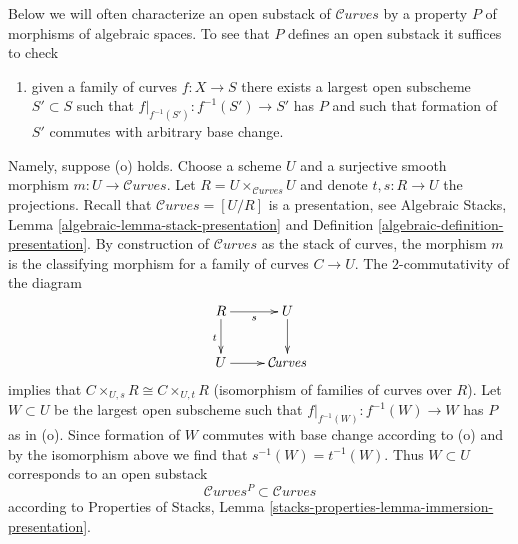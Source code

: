 \documentclass{stacks-project}
\theoremstyle{plain}
\theoremstyle{definition}
\theoremstyle{remark}
\numberwithin{equation}{subsection}
\def\Curvesstack{\mathcal{C}\!\mathit{urves}}
\begin{document}
\noindent
Below we will often characterize an open substack of $\Curvesstack$
by a property $P$ of morphisms of algebraic spaces. To see that $P$
defines an open substack it suffices to check
\begin{enumerate}
\item[(o)] given a family of curves $f : X \to S$ there exists
a largest open subscheme $S' \subset S$ such that
$f|_{f^{-1}(S')} : f^{-1}(S') \to S'$ has $P$ and such that
formation of $S'$ commutes with arbitrary base change.
\end{enumerate}
Namely, suppose (o) holds. Choose a scheme $U$ and a surjective
smooth morphism $m : U \to \Curvesstack$. Let
$R = U \times_{\Curvesstack} U$ and denote $t, s : R \to U$
the projections. Recall that $\Curvesstack = [U/R]$ is a presentation,
see Algebraic Stacks, Lemma \ref{algebraic-lemma-stack-presentation} and
Definition \ref{algebraic-definition-presentation}.
By construction of $\Curvesstack$ as
the stack of curves, the morphism $m$ is the classifying morphism
for a family of curves $C \to U$. The $2$-commutativity
of the diagram
$$
\xymatrix{
R \ar[r]_s \ar[d]_t & U \ar[d] \\
U \ar[r] & \Curvesstack
}
$$
implies that $C \times_{U, s} R  \cong C \times_{U, t} R$
(isomorphism of families of curves over $R$). Let $W \subset U$
be the largest open subscheme such that
$f|_{f^{-1}(W)} : f^{-1}(W) \to W$ has $P$ as in (o).
Since formation of $W$ commutes with base change according to (o)
and by the isomorphism above we find that $s^{-1}(W) = t^{-1}(W)$.
Thus $W \subset U$ corresponds to an open substack
$$
\Curvesstack^P \subset \Curvesstack
$$
according to Properties of Stacks, Lemma
\ref{stacks-properties-lemma-immersion-presentation}.
\end{document}
